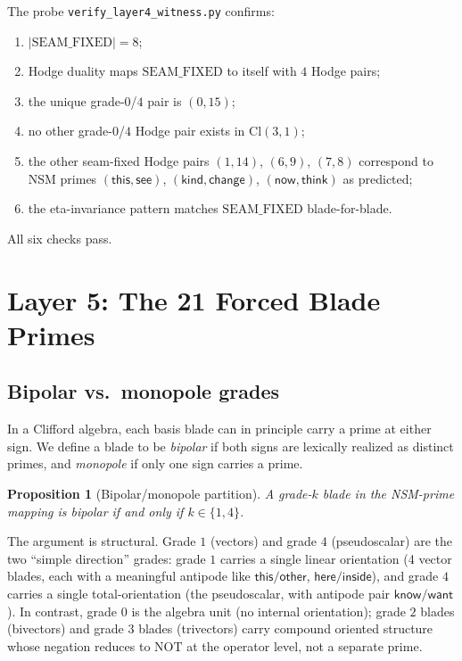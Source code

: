 \documentclass[11pt,a4paper]{article}
\theoremstyle{plain}
\newtheorem{proposition}[theorem]{Proposition}
\theoremstyle{definition}
\theoremstyle{remark}
\numberwithin{equation}{section}
\providecommand{\Cl}{\mathrm{Cl}}
\begin{document}
The probe \texttt{verify\_layer4\_witness.py} confirms:
\begin{enumerate}[label=(\alph*)]
\item $|\mathrm{SEAM\_FIXED}| = 8$;
\item Hodge duality maps $\mathrm{SEAM\_FIXED}$ to itself with $4$
      Hodge pairs;
\item the unique grade-$0$/$4$ pair is $(0, 15)$;
\item no other grade-$0$/$4$ Hodge pair exists in $\Cl(3,1)$;
\item the other seam-fixed Hodge pairs $(1, 14)$, $(6, 9)$,
      $(7, 8)$ correspond to NSM primes $(\mathsf{this},
      \mathsf{see})$, $(\mathsf{kind}, \mathsf{change})$,
      $(\mathsf{now}, \mathsf{think})$ as predicted;
\item the eta-invariance pattern matches $\mathrm{SEAM\_FIXED}$
      blade-for-blade.
\end{enumerate}
All six checks pass.


\section{Layer 5: The 21 Forced Blade Primes}\label{sec:layer5}

\subsection{Bipolar vs.\ monopole grades}

In a Clifford algebra, each basis blade can in principle carry a
prime at either sign.  We define a blade to be \emph{bipolar} if
both signs are lexically realized as distinct primes, and
\emph{monopole} if only one sign carries a prime.

\begin{proposition}[Bipolar/monopole partition]\label{prop:bipolar}
A grade-$k$ blade in the NSM-prime mapping is bipolar if and only
if $k \in \{1, 4\}$.
\end{proposition}

The argument is structural.  Grade $1$ (vectors) and grade $4$
(pseudoscalar) are the two ``simple direction'' grades: grade $1$
carries a single linear orientation (4 vector blades, each with a
meaningful antipode like $\mathsf{this}/\mathsf{other}$,
$\mathsf{here}/\mathsf{inside}$), and grade $4$ carries a single
total-orientation (the pseudoscalar, with antipode pair
$\mathsf{know}/\mathsf{want}$).  In contrast, grade $0$ is the
algebra unit (no internal orientation); grade $2$ blades
(bivectors) and grade $3$ blades (trivectors) carry compound
oriented structure whose negation reduces to $\mathrm{NOT}$ at the
operator level, not a separate prime.
\end{document}
